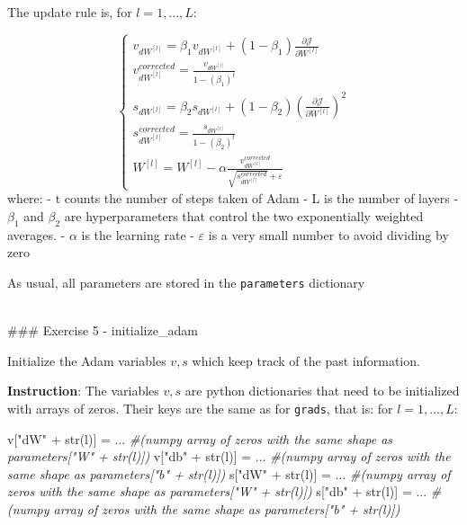 \documentclass[11pt]{article}
\newenvironment{Shaded}{}{}
\newcommand{\StringTok}[1]{\textcolor[rgb]{0.25,0.44,0.63}{{#1}}}
\newcommand{\CommentTok}[1]{\textcolor[rgb]{0.38,0.63,0.69}{\textit{{#1}}}}
\newcommand{\NormalTok}[1]{{#1}}
\newcommand{\OperatorTok}[1]{\textcolor[rgb]{0.40,0.40,0.40}{{#1}}}
\newcommand{\BuiltInTok}[1]{{#1}}
\begin{document}
The update rule is, for \(l = 1, ..., L\):

\[\begin{cases}
v_{dW^{[l]}} = \beta_1 v_{dW^{[l]}} + (1 - \beta_1) \frac{\partial \mathcal{J} }{ \partial W^{[l]} } \\
v^{corrected}_{dW^{[l]}} = \frac{v_{dW^{[l]}}}{1 - (\beta_1)^t} \\
s_{dW^{[l]}} = \beta_2 s_{dW^{[l]}} + (1 - \beta_2) (\frac{\partial \mathcal{J} }{\partial W^{[l]} })^2 \\
s^{corrected}_{dW^{[l]}} = \frac{s_{dW^{[l]}}}{1 - (\beta_2)^t} \\
W^{[l]} = W^{[l]} - \alpha \frac{v^{corrected}_{dW^{[l]}}}{\sqrt{s^{corrected}_{dW^{[l]}}} + \varepsilon}
\end{cases}\] where: - t counts the number of steps taken of Adam - L is
the number of layers - \(\beta_1\) and \(\beta_2\) are hyperparameters
that control the two exponentially weighted averages. - \(\alpha\) is
the learning rate - \(\varepsilon\) is a very small number to avoid
dividing by zero

As usual, all parameters are stored in the \texttt{parameters}
dictionary

    ~\\
\#\#\# Exercise 5 - initialize\_adam

Initialize the Adam variables \(v, s\) which keep track of the past
information.

\textbf{Instruction}: The variables \(v, s\) are python dictionaries
that need to be initialized with arrays of zeros. Their keys are the
same as for \texttt{grads}, that is: for \(l = 1, ..., L\):

\begin{Shaded}
\begin{Highlighting}[]
\NormalTok{v[}\StringTok{"dW"} \OperatorTok{+} \BuiltInTok{str}\NormalTok{(l)] }\OperatorTok{=}\NormalTok{ ... }\CommentTok{\#(numpy array of zeros with the same shape as parameters["W" + str(l)])}
\NormalTok{v[}\StringTok{"db"} \OperatorTok{+} \BuiltInTok{str}\NormalTok{(l)] }\OperatorTok{=}\NormalTok{ ... }\CommentTok{\#(numpy array of zeros with the same shape as parameters["b" + str(l)])}
\NormalTok{s[}\StringTok{"dW"} \OperatorTok{+} \BuiltInTok{str}\NormalTok{(l)] }\OperatorTok{=}\NormalTok{ ... }\CommentTok{\#(numpy array of zeros with the same shape as parameters["W" + str(l)])}
\NormalTok{s[}\StringTok{"db"} \OperatorTok{+} \BuiltInTok{str}\NormalTok{(l)] }\OperatorTok{=}\NormalTok{ ... }\CommentTok{\#(numpy array of zeros with the same shape as parameters["b" + str(l)])}
\end{Highlighting}
\end{Shaded}
\end{document}
